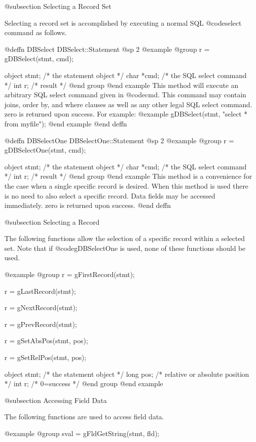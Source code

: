 @subsection Selecting a Record Set

Selecting a record set is accomplished by executing a normal SQL
@code{select} command as follows.

@deffn {DBSelect}  DBSelect::Statement
@sp 2
@example
@group
r = gDBSelect(stmt, cmd);

object  stmt;   /*  the statement object    */
char    *cmd;   /*  the SQL select command  */
int     r;      /*  result                  */
@end group
@end example
This method will execute an arbitrary SQL select command given in @code{cmd}.  This command may contain joins,
order by, and where clauses as well as any other legal SQL select command. zero is returned upon success.  For example:  
@example
gDBSelect(stmt, "select * from myfile");
@end example
@end deffn

@deffn {DBSelectOne}  DBSelectOne::Statement
@sp 2
@example
@group
r = gDBSelectOne(stmt, cmd);

object  stmt;   /*  the statement object    */
char    *cmd;   /*  the SQL select command  */
int     r;      /*  result                  */
@end group
@end example
This method is a convenience for the case when a single specific record
is desired.  When this method is used there is no need to also select a
specific record.  Data fields may be accessed immediately.  zero is
returned upon success.  
@end deffn


@subsection Selecting a Record

The following functions allow the selection of a specific record within a
selected set.  Note that if @code{gDBSelectOne} is used, none of these
functions should be used.

@example
@group
r = gFirstRecord(stmt);

r = gLastRecord(stmt);

r = gNextRecord(stmt);

r = gPrevRecord(stmt);

r = gSetAbsPos(stmt, pos);

r = gSetRelPos(stmt, pos);

object  stmt;   /*  the statement object           */
long    pos;    /*  relative or absolute position  */
int     r;      /*  0=success                      */
@end group
@end example


@subsection Accessing Field Data

The following functions are used to access field data.

@example
@group
sval = gFldGetString(stmt, fld);

